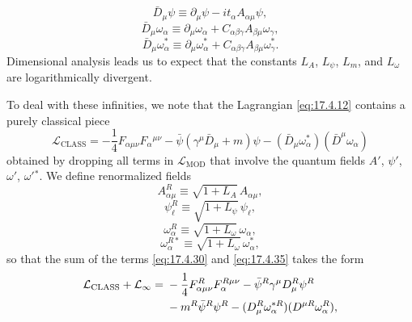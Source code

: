 \begin{equation}
\bar D_\mu\psi\equiv\partial_\mu\psi-it_\alpha A_{\alpha\mu}\psi,
\label{eq:17.4.32}
\end{equation}
\begin{equation}
\bar D_\mu\omega_\alpha\equiv
\partial_\mu\omega_\alpha
+C_{\alpha\beta\gamma}A_{\beta\mu}\omega_\gamma,
\label{eq:17.4.33}
\end{equation}
\begin{equation}
\bar D_\mu\omega_\alpha^*\equiv
\partial_\mu\omega_\alpha^*
+C_{\alpha\beta\gamma}A_{\beta\mu}\omega_\gamma^*.
\label{eq:17.4.34}
\end{equation}
Dimensional analysis leads us to expect that the constants $L_A$, $L_\psi$,
$L_m$, and $L_\omega$ are logarithmically divergent.

To deal with these infinities, we note that the Lagrangian \eqref{eq:17.4.12}
contains a purely classical piece
\begin{equation}
\mathcal L_{\mathrm{CLASS}}
=-\frac14F_{\alpha\mu\nu}F_\alpha{}^{\mu\nu}
-\bar\psi(\gamma^\mu\bar D_\mu+m)\psi
-(\bar D_\mu\omega_\alpha^*)(\bar D^\mu\omega_\alpha)
\label{eq:17.4.35}
\end{equation}
obtained by dropping all terms in $\mathcal L_{\mathrm{MOD}}$ that involve
the quantum fields $A'$, $\psi'$, $\omega'$, $\omega'{}^*$. We define
renormalized fields
\begin{equation}
A_{\alpha\mu}^R\equiv\sqrt{1+L_A}\,A_{\alpha\mu},
\label{eq:17.4.36}
\end{equation}
\begin{equation}
\psi_\ell^R\equiv\sqrt{1+L_\psi}\,\psi_\ell,
\label{eq:17.4.37}
\end{equation}
\begin{equation}
\omega_\alpha^R\equiv\sqrt{1+L_\omega}\,\omega_\alpha,
\label{eq:17.4.38}
\end{equation}
\begin{equation}
\omega_\alpha^{R*}\equiv\sqrt{1+L_\omega}\,\omega_\alpha^*,
\label{eq:17.4.39}
\end{equation}
so that the sum of the terms \eqref{eq:17.4.30} and \eqref{eq:17.4.35}
takes the form
\begin{align}
\mathcal L_{\mathrm{CLASS}}+\mathcal L_\infty
={}&-\frac14F_{\alpha\mu\nu}^R F_\alpha^{R\mu\nu}
-\bar\psi^R\gamma^\mu D_\mu^R\psi^R \notag\\
&-m^R\bar\psi^R\psi^R
-(D_\mu^R\omega_\alpha^{*R})(D^{\mu R}\omega_\alpha^R),
\label{eq:17.4.40}
\end{align}
